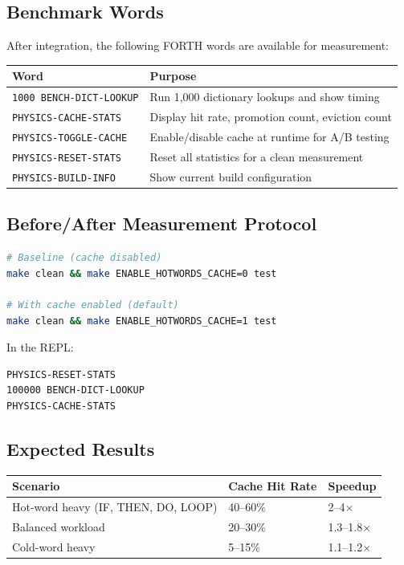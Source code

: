 \subsection{Benchmark Words}

After integration, the following FORTH words are available for measurement:

\begin{center}
\begin{tabular}{lp{8cm}}
\toprule
Word & Purpose \\
\midrule
\texttt{1000 BENCH-DICT-LOOKUP} & Run 1{,}000 dictionary lookups and show timing \\
\texttt{PHYSICS-CACHE-STATS}    & Display hit rate, promotion count, eviction count \\
\texttt{PHYSICS-TOGGLE-CACHE}   & Enable/disable cache at runtime for A/B testing \\
\texttt{PHYSICS-RESET-STATS}    & Reset all statistics for a clean measurement \\
\texttt{PHYSICS-BUILD-INFO}     & Show current build configuration \\
\bottomrule
\end{tabular}
\end{center}

\subsection{Before/After Measurement Protocol}

\begin{lstlisting}[language=bash]
# Baseline (cache disabled)
make clean && make ENABLE_HOTWORDS_CACHE=0 test

# With cache enabled (default)
make clean && make ENABLE_HOTWORDS_CACHE=1 test
\end{lstlisting}

In the REPL:

\begin{lstlisting}[language=forth]
PHYSICS-RESET-STATS
100000 BENCH-DICT-LOOKUP
PHYSICS-CACHE-STATS
\end{lstlisting}

\subsection{Expected Results}

\begin{center}
\begin{tabular}{lll}
\toprule
Scenario & Cache Hit Rate & Speedup \\
\midrule
Hot-word heavy (IF, THEN, DO, LOOP) & 40--60\% & 2--4$\times$ \\
Balanced workload                   & 20--30\% & 1.3--1.8$\times$ \\
Cold-word heavy                     & 5--15\%  & 1.1--1.2$\times$ \\
\bottomrule
\end{tabular}
\end{center}

